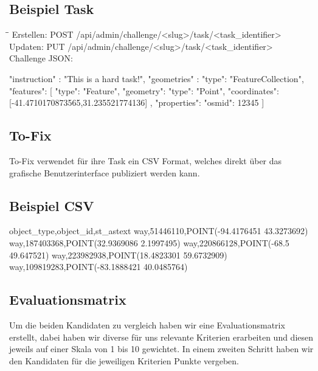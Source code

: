 \subsection*{Beispiel Task}
\begin{tabbing}
    \hspace*{4cm}\=\hspace*{5cm}\= \kill
    Erstellen: \> POST /api/admin/challenge/<slug>/task/<task\_identifier> \\
    Updaten: \> PUT /api/admin/challenge/<slug>/task/<task\_identifier> \\
    Challenge JSON: \\
\end{tabbing}
\begin{python}
{ 
  "instruction" : "This is a hard task!",
  "geometries" : {
    "type": "FeatureCollection",
    "features": [
      { "type": "Feature",
        "geometry": 
        { "type": "Point", 
          "coordinates":[-41.4710170873565,31.235521774136]
        },
        "properties": {"osmid": 12345}
      }
    ]
  }
}
\end{python}	

\subsection{To-Fix}
To-Fix verwendet für ihre Task ein CSV Format, welches direkt über das grafische Benutzerinterface publiziert werden kann.
\subsection*{Beispiel CSV}
\begin{python}
object_type,object_id,st_astext
way,51446110,POINT(-94.4176451 43.3273692)
way,187403368,POINT(32.9369086 2.1997495)
way,220866128,POINT(-68.5 49.647521)
way,223982938,POINT(18.4823301 59.6732909)
way,109819283,POINT(-83.1888421 40.0485764)
\end{python}


\subsection{Evaluationsmatrix}
Um die beiden Kandidaten zu vergleich haben wir eine Evaluationsmatrix erstellt, dabei haben wir diverse für uns relevante Kriterien erarbeiten und diesen jeweils auf einer Skala von 1 bis 10 gewichtet.
In einem zweiten Schritt haben wir den Kandidaten für die jeweiligen Kriterien Punkte vergeben.


